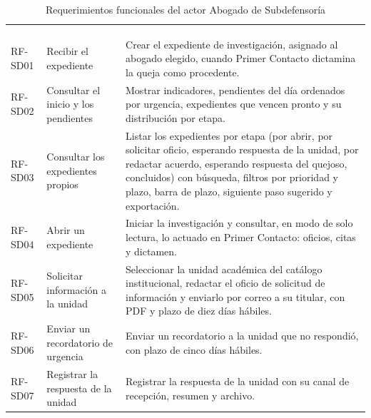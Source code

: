 	\begin{longtable}{|L{1.7cm}|L{4.0cm}|L{9.9cm}|}
		\hiderowcolors\caption{Requerimientos funcionales del actor Abogado de Subdefensoría}
		\label{tab:rf_sd} \\ \showrowcolors
		\hline
		 &  &  \\
		\hline
		\endfirsthead

		\hline
		 &  &  \\
		\hline
		\endhead

		RF-SD01 & Recibir el expediente & Crear el expediente de investigación, asignado al abogado
		elegido, cuando Primer Contacto dictamina la queja como procedente. \\ \hline

		RF-SD02 & Consultar el inicio y los pendientes & Mostrar indicadores, pendientes del día
		ordenados por urgencia, expedientes que vencen pronto y su distribución por etapa. \\ \hline

		RF-SD03 & Consultar los expedientes propios & Listar los expedientes por etapa (por abrir, por
		solicitar oficio, esperando respuesta de la unidad, por redactar acuerdo, esperando respuesta
		del quejoso, concluidos) con búsqueda, filtros por prioridad y plazo, barra de plazo, siguiente
		paso sugerido y exportación. \\ \hline

		RF-SD04 & Abrir un expediente & Iniciar la investigación y consultar, en modo de solo lectura,
		lo actuado en Primer Contacto: oficios, citas y dictamen. \\ \hline

		RF-SD05 & Solicitar información a la unidad & Seleccionar la unidad académica del catálogo
		institucional, redactar el oficio de solicitud de información y enviarlo por correo a su
		titular, con PDF y plazo de diez días hábiles. \\ \hline

		RF-SD06 & Enviar un recordatorio de urgencia & Enviar un recordatorio a la unidad que no
		respondió, con plazo de cinco días hábiles. \\ \hline

		RF-SD07 & Registrar la respuesta de la unidad & Registrar la respuesta de la unidad con su canal
		de recepción, resumen y archivo. \\ \hline


\end{longtable}
